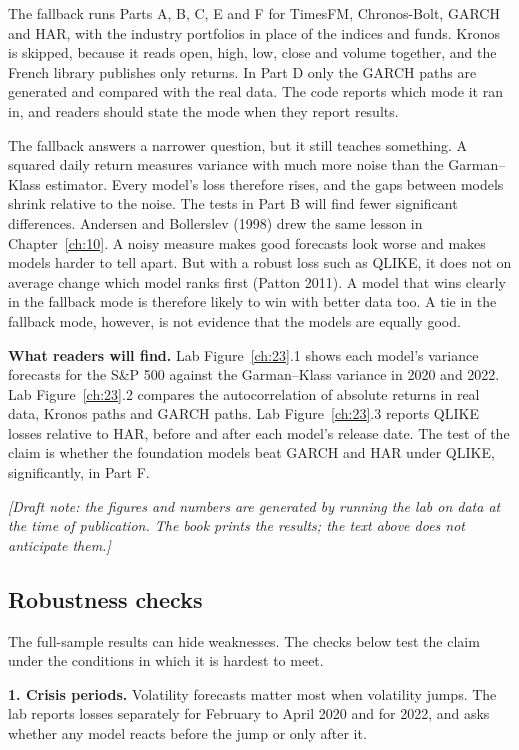 The fallback runs Parts A, B, C, E and F for TimesFM, Chronos-Bolt, GARCH and HAR, with the industry portfolios in place of the indices and funds. Kronos is skipped, because it reads open, high, low, close and volume together, and the French library publishes only returns. In Part D only the GARCH paths are generated and compared with the real data. The code reports which mode it ran in, and readers should state the mode when they report results.

The fallback answers a narrower question, but it still teaches something. A squared daily return measures variance with much more noise than the Garman--Klass estimator. Every model's loss therefore rises, and the gaps between models shrink relative to the noise. The tests in Part B will find fewer significant differences. Andersen and Bollerslev (1998) drew the same lesson in Chapter~\ref{ch:10}. A noisy measure makes good forecasts look worse and makes models harder to tell apart. But with a robust loss such as QLIKE, it does not on average change which model ranks first (Patton 2011). A model that wins clearly in the fallback mode is therefore likely to win with better data too. A tie in the fallback mode, however, is not evidence that the models are equally good.

\textbf{What readers will find.} Lab Figure~\ref{ch:23}.1 shows each model's variance forecasts for the S\&P 500 against the Garman--Klass variance in 2020 and 2022. Lab Figure~\ref{ch:23}.2 compares the autocorrelation of absolute returns in real data, Kronos paths and GARCH paths. Lab Figure~\ref{ch:23}.3 reports QLIKE losses relative to HAR, before and after each model's release date. The test of the claim is whether the foundation models beat GARCH and HAR under QLIKE, significantly, in Part F.

\emph{[Draft note: the figures and numbers are generated by running the lab on data at the time of publication. The book prints the results; the text above does not anticipate them.]}

\subsection{Robustness checks}
\label{sec:23-stress}

The full-sample results can hide weaknesses. The checks below test the claim under the conditions in which it is hardest to meet.

\textbf{1. Crisis periods.} Volatility forecasts matter most when volatility jumps. The lab reports losses separately for February to April 2020 and for 2022, and asks whether any model reacts before the jump or only after it.

